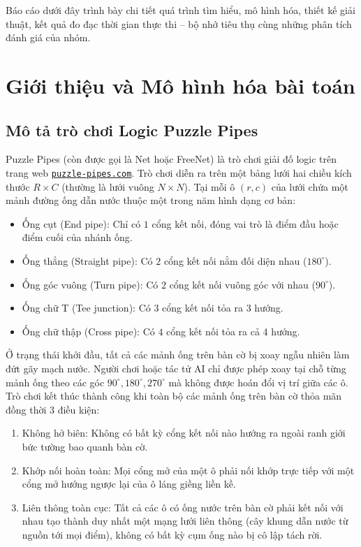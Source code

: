 \documentclass[a4paper]{article}
\begin{document}
Báo cáo dưới đây trình bày chi tiết quá trình tìm hiểu, mô hình hóa, thiết kế giải thuật, kết quả đo đạc thời gian thực thi -- bộ nhớ tiêu thụ cùng những phân tích đánh giá của nhóm.

\newpage

\section{Giới thiệu và Mô hình hóa bài toán}

\subsection{Mô tả trò chơi Logic Puzzle Pipes}
Puzzle Pipes (còn được gọi là Net hoặc FreeNet) là trò chơi giải đố logic trên trang web \href{https://www.puzzle-pipes.com/}{\texttt{puzzle-pipes.com}}. Trò chơi diễn ra trên một bảng lưới hai chiều kích thước $R \times C$ (thường là lưới vuông $N \times N$). Tại mỗi ô $(r, c)$ của lưới chứa một mảnh đường ống dẫn nước thuộc một trong năm hình dạng cơ bản:
\begin{itemize}
    \item Ống cụt (End pipe): Chỉ có $1$ cổng kết nối, đóng vai trò là điểm đầu hoặc điểm cuối của nhánh ống.
    \item Ống thẳng (Straight pipe): Có $2$ cổng kết nối nằm đối diện nhau ($180^\circ$).
    \item Ống góc vuông (Turn pipe): Có $2$ cổng kết nối vuông góc với nhau ($90^\circ$).
    \item Ống chữ T (Tee junction): Có $3$ cổng kết nối tỏa ra 3 hướng.
    \item Ống chữ thập (Cross pipe): Có $4$ cổng kết nối tỏa ra cả 4 hướng.
\end{itemize}

Ở trạng thái khởi đầu, tất cả các mảnh ống trên bàn cờ bị xoay ngẫu nhiên làm đứt gãy mạch nước. Người chơi hoặc tác tử AI chỉ được phép xoay tại chỗ từng mảnh ống theo các góc $90^\circ, 180^\circ, 270^\circ$ mà không được hoán đổi vị trí giữa các ô. Trò chơi kết thúc thành công khi toàn bộ các mảnh ống trên bàn cờ thỏa mãn đồng thời 3 điều kiện:
\begin{enumerate}
    \item Không hở biên: Không có bất kỳ cổng kết nối nào hướng ra ngoài ranh giới bức tường bao quanh bàn cờ.
    \item Khớp nối hoàn toàn: Mọi cổng mở của một ô phải nối khớp trực tiếp với một cổng mở hướng ngược lại của ô láng giềng liền kề.
    \item Liên thông toàn cục: Tất cả các ô có ống nước trên bàn cờ phải kết nối với nhau tạo thành duy nhất một mạng lưới liên thông (cây khung dẫn nước từ nguồn tới mọi điểm), không có bất kỳ cụm ống nào bị cô lập tách rời.
\end{enumerate}
\end{document}
